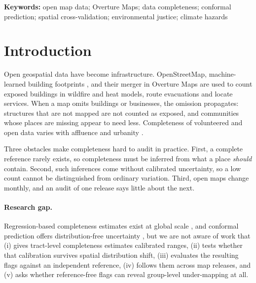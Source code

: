 \documentclass[11pt]{article}
\begin{document}
\noindent\textbf{Keywords:} open map data; Overture Maps; data completeness; conformal prediction; spatial cross-validation; environmental justice; climate hazards

\section{Introduction}

Open geospatial data have become infrastructure. OpenStreetMap, machine-learned building footprints \citep{msbuildings}, and their merger in Overture Maps \citep{overture} are used to count exposed buildings in wildfire and heat models, route evacuations and locate services. When a map omits buildings or businesses, the omission propagates: structures that are not mapped are not counted as exposed, and communities whose places are missing appear to need less. Completeness of volunteered and open data varies with affluence and urbanity \citep{haklay2010,mashhadi2013,thebaultspieker2018,herfort2023}.

Three obstacles make completeness hard to audit in practice. First, a complete reference rarely exists, so completeness must be inferred from what a place \emph{should} contain. Second, such inferences come without calibrated uncertainty, so a low count cannot be distinguished from ordinary variation. Third, open maps change monthly, and an audit of one release says little about the next.

\paragraph{Research gap.} Regression-based completeness estimates exist at global scale \citep{herfort2023}, and conformal prediction offers distribution-free uncertainty \citep{vovk2005,lei2018,romano2019}, but we are not aware of work that (i) gives tract-level completeness estimates calibrated ranges, (ii) tests whether that calibration survives spatial distribution shift, (iii) evaluates the resulting flags against an independent reference, (iv) follows them across map releases, and (v) asks whether reference-free flags can reveal group-level under-mapping at all.
\end{document}

